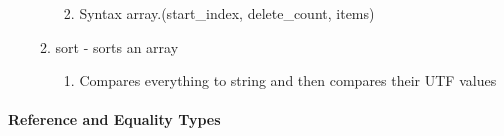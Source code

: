 \documentclass[
  paper=a4,
  ,captions=tableheading
]{scrartcl}
\providecommand{\tightlist}{%
  \setlength{\itemsep}{0pt}\setlength{\parskip}{0pt}}
\begin{document}
\begin{itemize}
\begin{enumerate}
    \begin{enumerate}
    \def\labelenumii{\arabic{enumii}.}
    \tightlist
    \item
      Syntax array.(start\_index, delete\_count, items)
    \end{enumerate}
  \item
    sort - sorts an array

    \begin{enumerate}
    \def\labelenumii{\arabic{enumii}.}
    \tightlist
    \item
      Compares everything to string and then compares their UTF values
    \end{enumerate}
  \end{enumerate}
\end{itemize}

\hypertarget{reference-and-equality-types}{%
\paragraph{Reference and Equality
Types}\label{reference-and-equality-types}}
\end{document}
